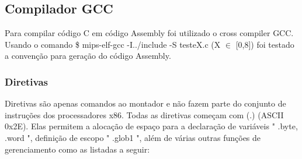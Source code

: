 \documentclass[12pt]{article}
\begin{document}
\subsection{Compilador GCC}
\label{subsec:comp}

Para compilar código C em código Assembly foi utilizado o cross compiler \cite{MIPS} GCC. Usando o comando \$ mips-elf-gcc -I../include -S testeX.c (X $\in$ [0,8]) foi testado a convenção para geração do código Assembly.

\subsubsection{Diretivas}
\label{subsubsec:diretivas}

Diretivas são apenas comandos ao montador e não fazem parte do conjunto de instruções dos processadores x86. Todas as diretivas começam com (.) (ASCII 0x2E). Elas permitem a alocação de espaço para a declaração de variáveis " .byte, .word ", definição de escopo " .glob1 ", além de várias outras funções de gerenciamento como as listadas a seguir:
\end{document}

